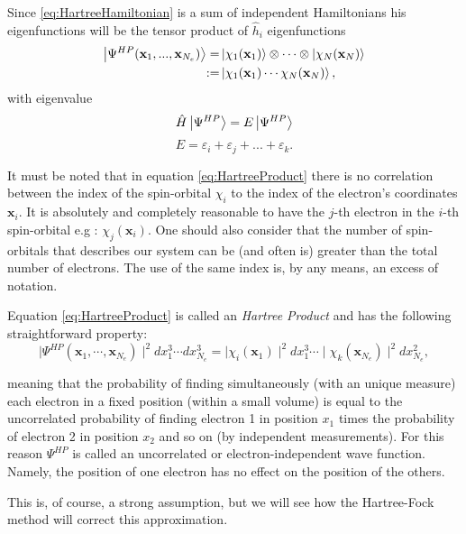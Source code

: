 \documentclass[a4paper,12pt]{article}
\begin{document}
Since \eqref{eq:HartreeHamiltonian} is a sum of independent Hamiltonians his eigenfunctions will be the tensor product of $\hat{h}_i$ eigenfunctions
\begin{align}\label{eq:HartreeProduct}
	\ket{\Psi^{HP}(\mathbf{x}_{1},...,\mathbf{x}_{N_e})} = & \ket{\chi_1(\mathbf{x}_{1})} \otimes \cdots  \otimes \ket{\chi_N(\mathbf{x}_{N})} \\
	:= & \ket{ \chi_{1}(\mathbf{x}_{1}) \cdots \chi_{N}(\mathbf{x}_{N}) },
\end{align}
with eigenvalue
\begin{equation}
	\hat{H}\ket{\Psi^{HP}} = E\ket{\Psi^{HP}}
\end{equation}
\begin{equation}
	E = \varepsilon_i + \varepsilon_j + ... + \varepsilon_k.
\end{equation}

It must be noted that in equation \eqref{eq:HartreeProduct} there is no correlation between the index of the spin-orbital $\chi_{i}$ to the index of the electron's coordinates $\mathbf{x}_i$. It is absolutely and completely reasonable to have the $j$-th electron in the $i$-th spin-orbital e.g : $\chi_{j}(\mathbf{x}_{i})$.
One should also consider that the number of spin-orbitals that describes our system can be (and often is) greater than the total number of electrons. The use of the same index is, by any means, an excess of notation.


Equation \eqref{eq:HartreeProduct} is called an \textit{Hartree Product} and has the following straightforward property: 
\begin{equation}\label{eq:uncorrelated}
	\mid\Psi^{HP}(\mathbf{x}_1,\cdots,\mathbf{x}_{N_e}) \mid^2 dx_1^3 \cdots dx_{N_e}^3 = \mid\chi_i(\mathbf{x}_1)\mid^2 dx_1^3 \cdots \mid \chi_k(\mathbf{x}_{N_e})\mid^2 dx_{N_e}^2,
\end{equation}

meaning that the probability of finding simultaneously (with an unique measure) each electron in a fixed position (within a small volume) is equal to the uncorrelated probability of finding electron 1 in position $x_1$ times the probability of electron 2 in position $x_2$ and so on (by independent measurements).
For this reason $\Psi^{HP}$ is called an uncorrelated or electron-independent wave function. 
Namely, the position of one electron has no effect on the position of the others. 

This is, of course, a strong assumption, but we will see how the Hartree-Fock method will correct this approximation.
\end{document}
